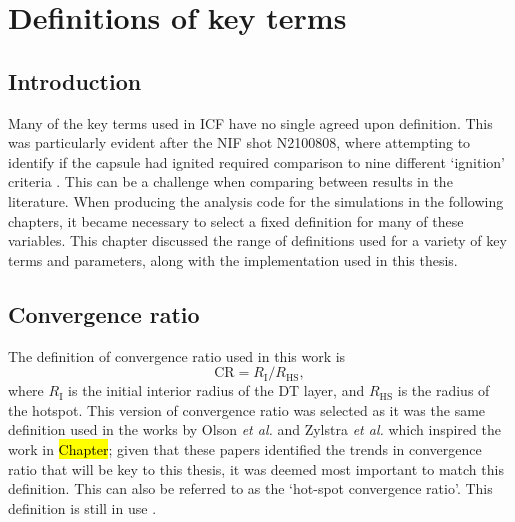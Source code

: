 

\chapter{\label{ch:definitions}Definitions of key terms} 

\minitoc

\section{Introduction}

Many of the key terms used in ICF have no single agreed upon definition. This was particularly evident after the NIF shot N2100808, where attempting to identify if the capsule had ignited required comparison to nine different `ignition' criteria \cite{Abu-Shawareb2022}. This can be a challenge when comparing between results in the literature. When producing the analysis code for the simulations in the following chapters, it became necessary to select a fixed definition for many of these variables. This chapter discussed the range of definitions used for a variety of key terms and parameters, along with the implementation used in this thesis.


\section{Convergence ratio}
The definition of convergence ratio used in this work is 
\begin{equation} \mathrm{CR} =  R_\mathrm{I}/R_\mathrm{HS}, \label{CR} \end{equation} 
where $R_\mathrm{I}$ is the initial interior radius of the DT layer, and $R_\mathrm{HS}$ is the radius of the hotspot. This version of convergence ratio was selected as it was the same definition used in the works by Olson \textit{et al.} \cite{Olson2016} and Zylstra \textit{et al.} \cite{Zylstra2018} which inspired the work in \hl{Chapter}; given that these papers identified the trends in convergence ratio that will be key to this thesis, it was deemed most important to match this definition. This can also be referred to as the `hot-spot convergence ratio'. This definition is still in use \cite{Olson2021}.

